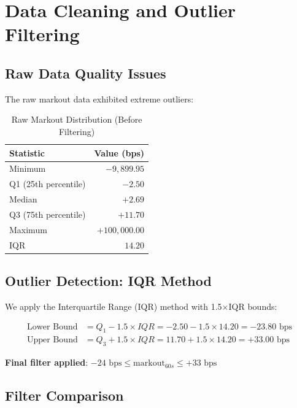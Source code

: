 \documentclass[11pt,a4paper]{article}
\begin{document}
\section{Data Cleaning and Outlier Filtering}

\subsection{Raw Data Quality Issues}

The raw markout data exhibited extreme outliers:

\begin{table}[H]
\centering
\caption{Raw Markout Distribution (Before Filtering)}
\begin{tabular}{lr}
\toprule
\textbf{Statistic} & \textbf{Value (bps)} \\
\midrule
Minimum & $-9,899.95$ \\
Q1 (25th percentile) & $-2.50$ \\
Median & $+2.69$ \\
Q3 (75th percentile) & $+11.70$ \\
Maximum & $+100,000.00$ \\
IQR & $14.20$ \\
\bottomrule
\end{tabular}
\end{table}

\subsection{Outlier Detection: IQR Method}

We apply the Interquartile Range (IQR) method with 1.5$\times$IQR bounds:

\begin{align}
\text{Lower Bound} &= Q_1 - 1.5 \times IQR = -2.50 - 1.5 \times 14.20 = -23.80 \text{ bps} \\
\text{Upper Bound} &= Q_3 + 1.5 \times IQR = 11.70 + 1.5 \times 14.20 = +33.00 \text{ bps}
\end{align}

\textbf{Final filter applied}: $-24 \text{ bps} \leq \text{markout}_{60s} \leq +33 \text{ bps}$

\subsection{Filter Comparison}
\end{document}
